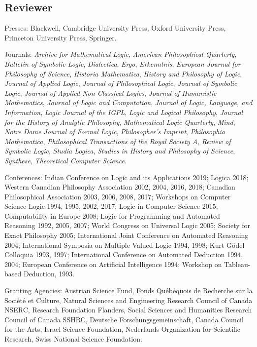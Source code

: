 \documentclass[11pt]{article}
\begin{document}
\subsection{Reviewer}
\ind Presses: Blackwell, Cambridge University Press, Oxford University Press,
Princeton University Press, Springer. 

\ind Journals: \emph{Archive for  Mathematical Logic},
\emph{American Philosophical Quarterly},
\emph{Bulletin of Symbolic Logic}, \emph{Dialectica}, \emph{Ergo},
\emph{Erkenntnis}, \emph{European Journal for Philosophy of Science},
\emph{Historia Mathematica}, \emph{History and Philosophy of Logic},
\emph{Journal of Applied Logic}, \emph{Journal of Philosophical Logic},
\emph{Journal of Symbolic Logic},
\emph{Journal of Applied Non-Classical Logics},
\emph{Journal of Humanistic Mathematics},
\emph{Journal of Logic and Computation},
\emph{Journal of Logic, Language, and Information},
\emph{Logic Journal of the IGPL}, \emph{Logic and Logical Philosophy},
\emph{Journal for the History of Analytic Philosophy},
\emph{Mathematical Logic Quarterly}, \emph{Mind},
\emph{Notre Dame Journal of Formal Logic}, \emph{Philosopher's Imprint},
\emph{Philosophia Mathematica},
\emph{Philosophical Transactions of the Royal Society A},
\emph{Review of Symbolic Logic}, \emph{Studia Logica},
\emph{Studies in History and Philosophy of Science}, \emph{Synthese},
\emph{Theoretical Computer Science}. 

\ind Conferences: Indian Conference on Logic and its Applications 2019;
Logica 2018; Western Canadian Philosophy Association 2002, 2004, 2016,
2018; Canadian Philosophical Association 2003, 2006, 2008, 2017;
Workshops on Computer Science Logic 1994, 1995, 2002, 2017; Logic in
Computer Science 2015; Computability in Europe 2008; Logic for
Programming and Automated Reasoning 1992, 2005, 2007; World Congress on
Universal Logic 2005; Society for Exact Philosophy 2005; International
Joint Conference on Automated Reasoning 2004; International Symposia on
Multiple Valued Logic 1994, 1998; Kurt Gödel Colloquia 1993, 1997;
International Conference on Automated Deduction 1994, 2004; European
Conference on Artificial Intelligence 1994; Workshop on Tableau-based
Deduction, 1993. 

\ind Granting Agencies: Austrian Science Fund, Fonds Québéquois de Recherche
sur la Société et Culture, Natural Sciences and Engineering Research
Council of Canada NSERC, Research Foundation Flanders, Social Sciences
and Humanities Research Council of Canada SSHRC, Deutsche
Forschungsgemeinschaft, Canada Council for the Arts, Israel Science
Foundation, Nederlands Organization for Scientific Research, Swiss
National Science Foundation. 
\end{document}

